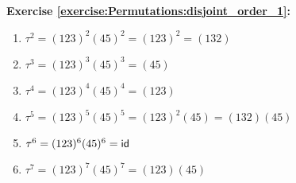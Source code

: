 \noindent\textbf{Exercise \ref{exercise:Permutations:disjoint_order_1}:}
\begin{enumerate}[{a.}]
\item 
$\tau^2 = (123)^2(45)^2 = (123)^2 = (132)$

\item 
$\tau^3 = (123)^3(45)^3 = (45)$

\item 
$\tau^4 = (123)^4(45)^4 = (123)$

\item 
$\tau^5 = (123)^5(45)^5 = (123)^2(45) = (132)(45)$

\item 
$\tau^6 =  (123)^6(45)^6 = \sf{id}$

\item
$\tau^7 =  (123)^7(45)^7 = (123)(45)$
\end{enumerate}


